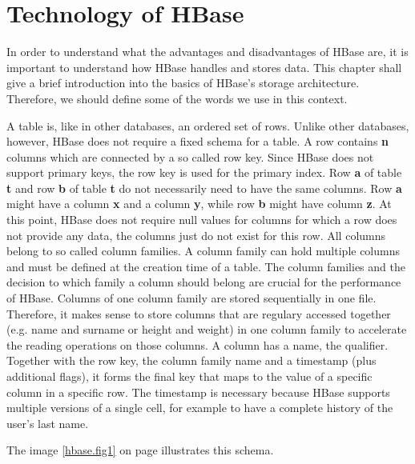
\chapter{Technology of HBase}
\label{lblHBaseTechnologies}

In order to understand what the advantages and disadvantages of HBase are, it is important to understand how HBase handles and stores data.
This chapter shall give a brief introduction into the basics of HBase's storage architecture. Therefore, we should define some of the words
we use in this context.

A table is, like in other databases, an ordered set of rows. Unlike other databases, however, HBase does not require a fixed schema for a table.
A row contains \textbf{n} columns which are connected by a so called row key. Since HBase does not support primary keys, the row key is used for the primary
index. Row \textbf{a} of table \textbf{t }and row \textbf{b} of table \textbf{t} do not necessarily need to have the same columns. Row \textbf{a} might have a column \textbf{x} and a column \textbf{y}, while
row \textbf{b} might have column \textbf{z}. At this point, HBase does not require null values for columns for which a row does not provide any data, the columns
just do not exist for this row. \cite{hbase.george.2011}
All columns belong to so called column families. A column family can hold multiple columns and must be defined at the creation time of a table.
The column families and the decision to which family a column should belong are crucial for the performance of HBase. Columns of one column family
are stored sequentially in one file. Therefore, it makes sense to store columns that are regulary accessed together (e.g. name and surname or height and weight)
in one column family to accelerate the reading operations on those columns. \cite{hbase.george.2011}
A column has a name, the qualifier. Together with the row key, the column family name and a timestamp (plus additional flags), it forms the
final key that maps to the value of a specific column in a specific row. The timestamp is necessary because HBase supports multiple versions of a single cell, for example
to have a complete history of the user's last name. \cite{hbase.bertozzi.2012} \cite{hbase.george.2011}

The image \ref{hbase.fig1} on page \pageref{hbase.fig1} illustrates this schema.

